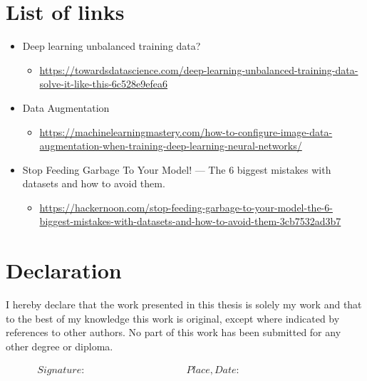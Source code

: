 \documentclass[10pt]{article}
\begin{document}
	\section*{List of links}
		\begin{itemize}
			\item Deep learning unbalanced training data?
			\begin{itemize}
				\item \url{https://towardsdatascience.com/deep-learning-unbalanced-training-data-solve-it-like-this-6c528e9efea6}
			\end{itemize}
			\item Data Augmentation
			\begin{itemize}
				\item \url{https://machinelearningmastery.com/how-to-configure-image-data-augmentation-when-training-deep-learning-neural-networks/}
			\end{itemize}
			\item Stop Feeding Garbage To Your Model! — The 6 biggest mistakes with datasets and how to avoid them.
			\begin{itemize}
				\item \url{https://hackernoon.com/stop-feeding-garbage-to-your-model-the-6-biggest-mistakes-with-datasets-and-how-to-avoid-them-3cb7532ad3b7}
			\end{itemize}
		\end{itemize}
	


	\pagebreak
	\section*{Declaration}
		\thispagestyle{empty}
		
		\noindent I hereby declare that the work presented in this thesis is solely my work and that to the best of my
		knowledge this work is original, except where indicated by references to other authors. No part of this
		work has been submitted for any other degree or diploma. 
		
		\begin{displaymath}
		\begin{array}{ll}
		Signature:~~~~~~~~~~~~~~~~~~~~~~~~~~~~~~~~~~~~~~~~~~
		& Place, Date:~~~~~~~~~~~~~~~~~~~~~~~~~~~~~~~~~~~~~~~~~~
		\end{array}
		\end{displaymath}
\end{document}

